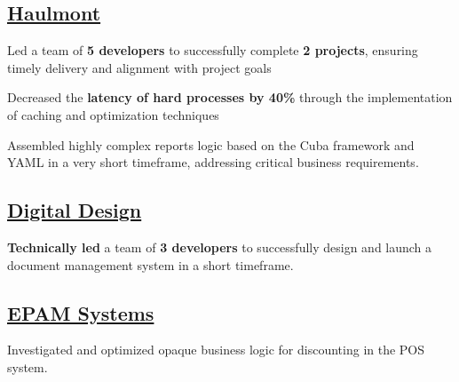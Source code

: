 \documentclass[letter,10pt]{article}
\begin{document}
\subsection{{\large\href{https://www.haulmont.com/}{Haulmont}}}



\begin{zitemize}
\item Led a team of \textbf{5 developers} to successfully complete \textbf{2 projects}, ensuring timely delivery and alignment with project goals

\item Decreased the \textbf{latency of hard processes by 40\%} through the implementation of caching and optimization techniques

\item Assembled highly complex reports logic based on the Cuba framework and YAML in a very short timeframe, addressing critical business requirements.

\end{zitemize}


\subsection{{\large\href{https://www.digdes.com/}{Digital Design}}}


\begin{zitemize}
\item \textbf{Technically led} a team of \textbf{3 developers} to successfully design and launch a document management system in a short timeframe.
\end{zitemize}


\subsection{{\large\href{https://www.epam.com/}{EPAM Systems}}}
\begin{zitemize}
\item Investigated and optimized opaque business logic for discounting in the POS system.
\end{zitemize}


\end{document}

